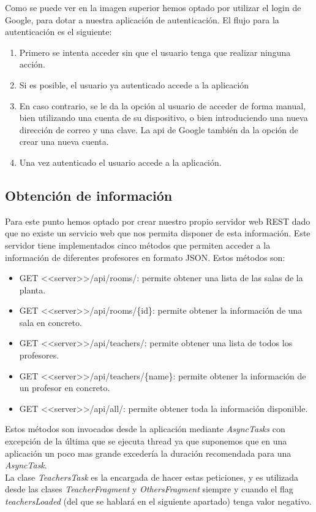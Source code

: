 \documentclass[12pt, a4paper, titlepage]{article}
\begin{document}
	Como se puede ver en la imagen superior hemos optado por utilizar el login de Google, para dotar a nuestra aplicación de autenticación. El flujo para la autenticación es el siguiente:
	\begin{enumerate}
		\item Primero se intenta acceder sin que el usuario tenga que realizar ninguna acción.
		\item Si es posible, el usuario ya autenticado accede a la aplicación
		\item En caso contrario, se le da la opción al usuario de acceder de forma manual, bien utilizando una cuenta de su dispositivo, o bien introduciendo una nueva dirección de correo y una clave. La api de Google también da la opción de crear una nueva cuenta.
		\item Una vez autenticado el usuario accede a la aplicación.
	\end{enumerate}
	\subsection{Obtención de información}
	Para este punto hemos optado por crear nuestro propio servidor web REST dado que no existe un servicio web que nos permita disponer de esta información. Este servidor tiene implementados cinco métodos que permiten acceder a la información de diferentes profesores en formato JSON. Estos métodos son: 
	\begin{itemize}
		\item GET <<server>>/api/rooms/: permite obtener una lista de las salas de la planta.
		\item GET <<server>>/api/rooms/\{id\}: permite obtener la información de una sala en concreto.
		\item GET <<server>>/api/teachers/: permite obtener una lista de todos los profesores.
		\item GET <<server>>/api/teachers/\{name\}:  permite obtener la información de un profesor en concreto.
		\item GET <<server>>/api/all/:  permite obtener toda la información disponible.
	\end{itemize}
	Estos métodos son invocados desde la aplicación mediante \textit{AsyncTasks} con excepción de la última que se ejecuta thread ya que suponemos que en una aplicación un poco mas grande excedería la duración recomendada para una \textit{AsyncTask}.\\
	La clase \textit{TeachersTask} es la encargada de hacer estas peticiones, y es utilizada desde las clases \textit{TeacherFragment} y \textit{OthersFragment} siempre y cuando el flag \textit{teachersLoaded} (del que se hablará en el siguiente apartado) tenga valor negativo.
	
\end{document}
